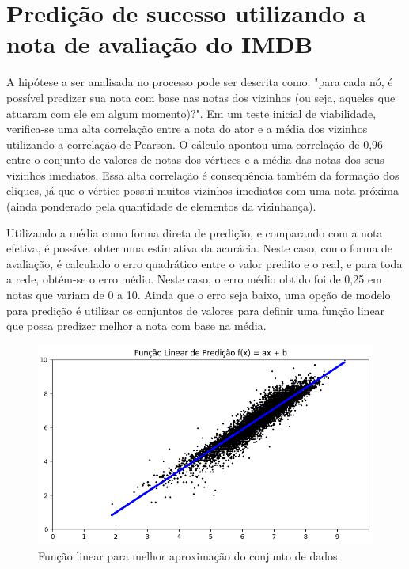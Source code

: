\chapter{Predição de sucesso utilizando a nota de avaliação do IMDB}

A hipótese a ser analisada no processo pode ser descrita como: "para cada nó, é possível predizer sua nota com base nas notas dos vizinhos (ou seja, aqueles que atuaram com ele em algum momento)?". Em um teste inicial de viabilidade, verifica-se uma alta correlação entre a nota do ator e a média dos vizinhos utilizando a correlação de Pearson. O cálculo apontou uma correlação de 0,96 entre o conjunto de valores de notas dos vértices e a média das notas dos seus vizinhos imediatos. Essa alta correlação é consequência também da formação dos cliques, já que o vértice possui muitos vizinhos imediatos com uma nota próxima (ainda ponderado pela quantidade de elementos da vizinhança).

Utilizando a média como forma direta de predição, e comparando com a nota efetiva, é possível obter uma estimativa da acurácia. Neste caso, como forma de avaliação, é calculado o erro quadrático entre o valor predito e o real, e para toda a rede, obtém-se o erro médio. Neste caso, o erro médio obtido foi de 0,25 em notas que variam de 0 a 10. Ainda que o erro seja baixo, uma opção de modelo para predição é utilizar os conjuntos de valores para definir uma função linear que possa predizer melhor a nota com base na média. 

\begin{figure}[!htb]
\centering
\includegraphics[width=15cm]{img/funcaolinear.png}
\caption{Função linear para melhor aproximação do conjunto de dados}
\label{fig:funcaolinear}
\end{figure}

